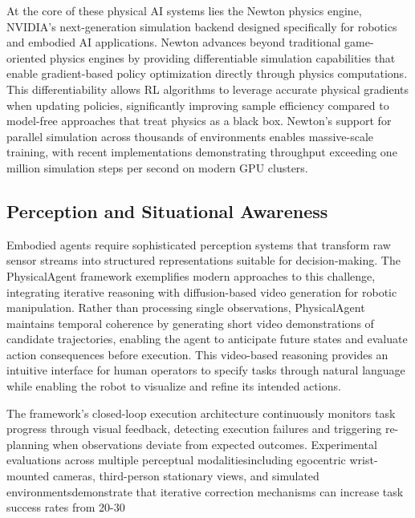 At the core of these physical AI systems lies the Newton physics engine, NVIDIA's next-generation simulation backend designed specifically for robotics and embodied AI applications. Newton advances beyond traditional game-oriented physics engines by providing differentiable simulation capabilities that enable gradient-based policy optimization directly through physics computations. This differentiability allows RL algorithms to leverage accurate physical gradients when updating policies, significantly improving sample efficiency compared to model-free approaches that treat physics as a black box. Newton's support for parallel simulation across thousands of environments enables massive-scale training, with recent implementations demonstrating throughput exceeding one million simulation steps per second on modern GPU clusters.

\subsection{Perception and Situational Awareness}

Embodied agents require sophisticated perception systems that transform raw sensor streams into structured representations suitable for decision-making. The PhysicalAgent framework exemplifies modern approaches to this challenge, integrating iterative reasoning with diffusion-based video generation for robotic manipulation. Rather than processing single observations, PhysicalAgent maintains temporal coherence by generating short video demonstrations of candidate trajectories, enabling the agent to anticipate future states and evaluate action consequences before execution. This video-based reasoning provides an intuitive interface for human operators to specify tasks through natural language while enabling the robot to visualize and refine its intended actions.

The framework's closed-loop execution architecture continuously monitors task progress through visual feedback, detecting execution failures and triggering re-planning when observations deviate from expected outcomes. Experimental evaluations across multiple perceptual modalitiesincluding egocentric wrist-mounted cameras, third-person stationary views, and simulated environmentsdemonstrate that iterative correction mechanisms can increase task success rates from 20-30%

